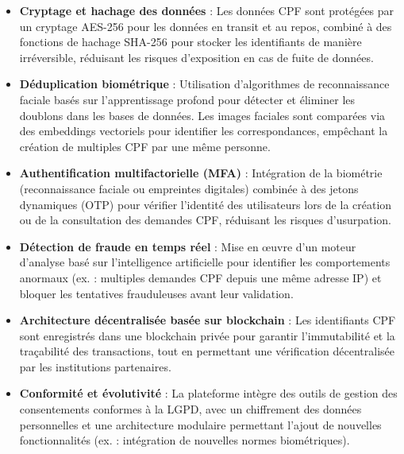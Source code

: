 \begin{itemize}[label=\textbullet]
\item \textbf{Cryptage et hachage des données} : Les données CPF sont protégées par un cryptage AES-256 pour les données en transit et au repos, combiné à des fonctions de hachage SHA-256 pour stocker les identifiants de manière irréversible, réduisant les risques d'exposition en cas de fuite de données.

    \item \textbf{Déduplication biométrique} : Utilisation d'algorithmes de reconnaissance faciale basés sur l'apprentissage profond pour détecter et éliminer les doublons dans les bases de données. Les images faciales sont comparées via des embeddings vectoriels pour identifier les correspondances, empêchant la création de multiples CPF par une même personne.

    \item \textbf {Authentification multifactorielle (MFA)} : Intégration de la biométrie (reconnaissance faciale ou empreintes digitales) combinée à des jetons dynamiques (OTP) pour vérifier l'identité des utilisateurs lors de la création ou de la consultation des demandes CPF, réduisant les risques d'usurpation.

    \item \textbf{Détection de fraude en temps réel} : Mise en œuvre d'un moteur d'analyse basé sur l'intelligence artificielle pour identifier les comportements anormaux (ex. : multiples demandes CPF depuis une même adresse IP) et bloquer les tentatives frauduleuses avant leur validation.

    \item \textbf{Architecture décentralisée basée sur blockchain} : Les identifiants CPF sont enregistrés dans une blockchain privée pour garantir l'immutabilité et la traçabilité des transactions, tout en permettant une vérification décentralisée par les institutions partenaires.

    \item \textbf{Conformité et évolutivité} : La plateforme intègre des outils de gestion des consentements conformes à la LGPD, avec un chiffrement des données personnelles et une architecture modulaire permettant l'ajout de nouvelles fonctionnalités (ex. : intégration de nouvelles normes biométriques).
\end{itemize}

\vspace{0.5cm} %

